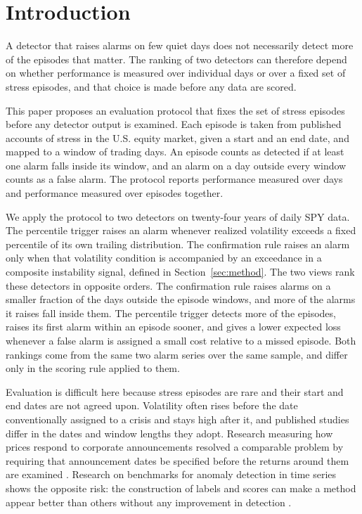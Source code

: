 \documentclass[pdflatex,sn-mathphys-num,iicol]{sn-jnl}
\begin{document}
\section{Introduction}
A detector that raises alarms on few quiet days does not necessarily detect more of the episodes that matter. The ranking of two detectors can therefore depend on whether performance is measured over individual days or over a fixed set of stress episodes, and that choice is made before any data are scored.

This paper proposes an evaluation protocol that fixes the set of stress episodes before any detector output is examined. Each episode is taken from published accounts of stress in the U.S. equity market, given a start and an end date, and mapped to a window of trading days. An episode counts as detected if at least one alarm falls inside its window, and an alarm on a day outside every window counts as a false alarm. The protocol reports performance measured over days and performance measured over episodes together.

We apply the protocol to two detectors on twenty-four years of daily SPY data. The percentile trigger raises an alarm whenever realized volatility exceeds a fixed percentile of its own trailing distribution. The confirmation rule raises an alarm only when that volatility condition is accompanied by an exceedance in a composite instability signal, defined in Section~\ref{sec:method}. The two views rank these detectors in opposite orders. The confirmation rule raises alarms on a smaller fraction of the days outside the episode windows, and more of the alarms it raises fall inside them. The percentile trigger detects more of the episodes, raises its first alarm within an episode sooner, and gives a lower expected loss whenever a false alarm is assigned a small cost relative to a missed episode. Both rankings come from the same two alarm series over the same sample, and differ only in the scoring rule applied to them.

Evaluation is difficult here because stress episodes are rare and their start and end dates are not agreed upon. Volatility often rises before the date conventionally assigned to a crisis and stays high after it, and published studies differ in the dates and window lengths they adopt. Research measuring how prices respond to corporate announcements resolved a comparable problem by requiring that announcement dates be specified before the returns around them are examined \cite{brown1985, mackinlay1997}. Research on benchmarks for anomaly detection in time series shows the opposite risk: the construction of labels and scores can make a method appear better than others without any improvement in detection \cite{lavin2015, wu2022}.
\end{document}
